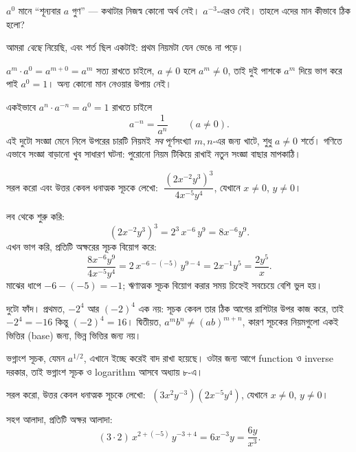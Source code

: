 \documentclass[11pt]{article}
\begin{document}
\begin{idea}[$a^0$ ও ঋণাত্মক সূচক আবিষ্কার নয়, সিদ্ধান্ত]
$a^0$ মানে ``শূন্যবার $a$ গুণ'' --- কথাটার নিজস্ব কোনো অর্থ নেই। $a^{-3}$-এরও নেই।
তাহলে এদের মান কীভাবে ঠিক হলো?

আমরা \emph{বেছে} নিয়েছি, এবং শর্ত ছিল একটাই: প্রথম নিয়মটা যেন ভেঙে না পড়ে।

$a^m \cdot a^0 = a^{m+0} = a^m$ সত্য রাখতে চাইলে, $a \neq 0$ হলে $a^m \neq 0$,
তাই দুই পাশকে $a^m$ দিয়ে ভাগ করে পাই $a^0 = 1$। অন্য কোনো মান নেওয়ার উপায় নেই।

একইভাবে $a^n \cdot a^{-n} = a^0 = 1$ রাখতে চাইলে
\[
  a^{-n} = \frac{1}{a^{n}} \qquad (a \neq 0).
\]
এই দুটো সংজ্ঞা মেনে নিলে উপরের চারটি নিয়মই \emph{সব} পূর্ণসংখ্যা $m, n$-এর জন্য
খাটে, শুধু $a \neq 0$ শর্তে। গণিতে এভাবে সংজ্ঞা বাড়ানো খুব সাধারণ ঘটনা: পুরোনো
নিয়ম টিকিয়ে রাখাই নতুন সংজ্ঞা বাছার মাপকাঠি।
\end{idea}

\begin{example}
সরল করো এবং উত্তর কেবল ধনাত্মক সূচকে লেখো:
$\;\dfrac{(2x^{-2}y^{3})^{3}}{4x^{-5}y^{4}}$, যেখানে $x \neq 0$, $y \neq 0$।
\end{example}

\begin{solbox}
লব থেকে শুরু করি:
\[
  (2x^{-2}y^{3})^{3} = 2^{3} \, x^{-6} \, y^{9} = 8x^{-6}y^{9} .
\]
এখন ভাগ করি, প্রতিটি অক্ষরের সূচক বিয়োগ করে:
\[
  \frac{8x^{-6}y^{9}}{4x^{-5}y^{4}}
  = 2 \, x^{-6-(-5)} \, y^{9-4}
  = 2x^{-1}y^{5}
  = \frac{2y^{5}}{x} .
\]
মাঝের ধাপে $-6 - (-5) = -1$; ঋণাত্মক সূচক বিয়োগ করার সময় চিহ্নেই সবচেয়ে বেশি
ভুল হয়।
\end{solbox}

\begin{remark}
দুটো ফাঁদ। প্রথমত, $-2^{4}$ আর $(-2)^{4}$ এক নয়: সূচক কেবল তার ঠিক আগের রাশিটার
উপর কাজ করে, তাই $-2^{4} = -16$ কিন্তু $(-2)^{4} = 16$। দ্বিতীয়ত, $a^{m}b^{n}\neq(ab)^{m+n}$, কারণ সূচকের নিয়মগুলো একই ভিত্তির (base) জন্য, ভিন্ন ভিত্তির জন্য নয়।

ভগ্নাংশ সূচক, যেমন $a^{1/2}$, এখানে ইচ্ছে করেই বাদ রাখা হয়েছে। ওটার জন্য আগে
function ও inverse দরকার, তাই ভগ্নাংশ সূচক ও logarithm আসবে অধ্যায় ৮-এ।
\end{remark}

 সরল করো, উত্তর কেবল ধনাত্মক সূচকে লেখো: $\;(3x^{2}y^{-3})(2x^{-5}y^{4})$,
যেখানে $x \neq 0$, $y \neq 0$।

\begin{sol}
সহগ আলাদা, প্রতিটি অক্ষর আলাদা:
\[
  (3 \cdot 2)\, x^{2 + (-5)} \, y^{-3 + 4} = 6x^{-3}y = \frac{6y}{x^{3}} .
\]
\end{sol}
\end{document}
